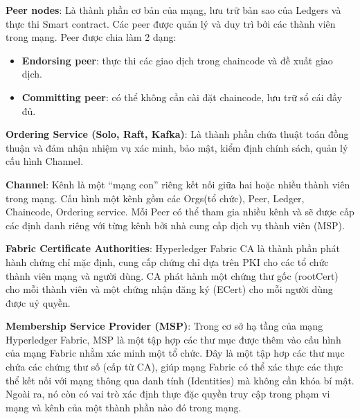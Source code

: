 \textbf{Peer nodes}: Là thành phần cơ bản của mạng, lưu trữ bản sao của Ledgers và thực thi Smart contract. Các peer được quản lý và duy trì bởi các thành viên trong mạng. Peer được chia làm 2 dạng:

\begin{itemize}
\item \textbf{Endorsing peer}: thực thi các giao dịch trong chaincode và đề xuất giao dịch.
\item \textbf{Committing peer}: có thể không cần cài đặt chaincode, lưu trữ sổ cái đầy đủ.
\end{itemize}

\textbf{Ordering Service (Solo, Raft, Kafka)}: Là thành phần chứa thuật toán đồng thuận và đảm nhận nhiệm vụ xác minh, bảo mật, kiểm định chính sách, quản lý cấu hình Channel.

\textbf{Channel}: Kênh là một “mạng con” riêng kết nối giữa hai hoặc nhiều thành viên trong mạng. Cấu hình một kênh gồm các Orgs(tổ chức), Peer, Ledger, Chaincode, Ordering service. Mỗi Peer có thể tham gia nhiều kênh và sẽ được cấp các định danh riêng với từng kênh bởi nhà cung cấp dịch vụ thành viên (MSP).

\textbf{Fabric Certificate Authorities}: Hyperledger Fabric CA là thành phần phát hành chứng chỉ mặc định, cung cấp chứng chỉ dựa trên PKI cho các tổ chức thành viên mạng và người dùng. CA phát hành một chứng thư gốc (rootCert) cho mỗi thành viên và một chứng nhận đăng ký (ECert) cho mỗi người dùng được uỷ quyền.

\textbf{Membership Service Provider (MSP)}: Trong cơ sở hạ tầng của mạng  Hyperledger Fabric, MSP là một tập hợp các thư mục được thêm vào cấu hình của mạng Fabric nhằm xác minh một tổ chức. Đây là một tập hơp các thư mục chứa các chứng thư số (cấp từ CA), giúp mạng Fabric có thể xác thực các thực thể kết nối với mạng thông qua danh tính (Identities) mà không cần khóa bí mật. Ngoài ra, nó còn có vai trò xác định thực đặc quyền truy cập trong phạm vi mạng và kênh của một thành phần nào đó trong mạng.